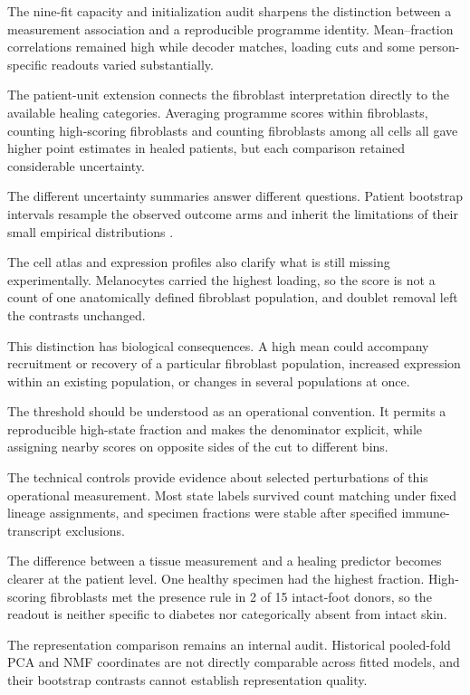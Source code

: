 \documentclass[10pt,a4paper]{article}
\begin{document}
The nine-fit capacity and initialization audit sharpens the distinction between a measurement association and a reproducible programme identity. Mean--fraction correlations remained high while decoder matches, loading cuts and some person-specific readouts varied substantially.

The patient-unit extension connects the fibroblast interpretation directly to the available healing categories. Averaging programme scores within fibroblasts, counting high-scoring fibroblasts and counting fibroblasts among all cells all gave higher point estimates in healed patients, but each comparison retained considerable uncertainty.

The different uncertainty summaries answer different questions. Patient bootstrap intervals resample the observed outcome arms and inherit the limitations of their small empirical distributions \citep{efron1993}.

The cell atlas and expression profiles also clarify what is still missing experimentally. Melanocytes carried the highest loading, so the score is not a count of one anatomically defined fibroblast population, and doublet removal left the contrasts unchanged.

This distinction has biological consequences. A high mean could accompany recruitment or recovery of a particular fibroblast population, increased expression within an existing population, or changes in several populations at once.

The threshold should be understood as an operational convention. It permits a reproducible high-state fraction and makes the denominator explicit, while assigning nearby scores on opposite sides of the cut to different bins.

The technical controls provide evidence about selected perturbations of this operational measurement. Most state labels survived count matching under fixed lineage assignments, and specimen fractions were stable after specified immune-transcript exclusions.

The difference between a tissue measurement and a healing predictor becomes clearer at the patient level. One healthy specimen had the highest fraction. High-scoring fibroblasts met the presence rule in 2 of 15 intact-foot donors, so the readout is neither specific to diabetes nor categorically absent from intact skin.

The representation comparison remains an internal audit. Historical pooled-fold PCA and NMF coordinates are not directly comparable across fitted models, and their bootstrap contrasts cannot establish representation quality.
\end{document}
